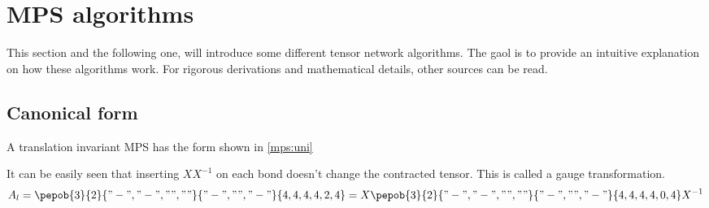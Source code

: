 \section{MPS algorithms}

This section and the following one, will introduce some different tensor network algorithms. The gaol is to provide an intuitive explanation on how these algorithms work. For rigorous derivations and mathematical details, other sources can be read. 

\subsection{Canonical form}

A translation invariant MPS has the form shown in \cref{mps:uni}

It can be easily seen that inserting $X X^{-1}$ on each bond doesn't change the contracted tensor. This is called a gauge transformation.
\begin{equation}
    A_l = \pepob{3}{2}{{
                "-","-",
                "",""}}{{
                "-",
                "",
                "-"}}{{
                4,4,4,
                4,2,4}}  =X \pepob{3}{2}{{
                "-","-",
                "",""}}{{
                "-",
                "",
                "-"}}{{
                4,4,4,
                4,0,4}} X^{-1}
\end{equation}

